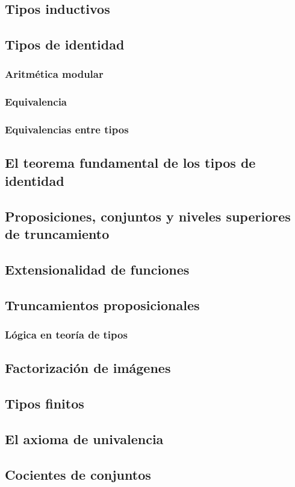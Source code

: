 \documentclass{article}
\begin{document}
\subsection{Tipos inductivos}

\subsection{Tipos de identidad}

\subsubsection{Aritmética modular}

\subsubsection{Equivalencia}
    \subsubsection{Equivalencias entre tipos}
\subsection{El teorema fundamental de los tipos de identidad}
\subsection{Proposiciones, conjuntos y niveles superiores de truncamiento}
\subsection{Extensionalidad de funciones}
\subsection{Truncamientos proposicionales}
\subsubsection{Lógica en teoría de tipos}
\subsection{Factorización de imágenes}
\subsection{Tipos finitos}
\subsection{El axioma de univalencia}
\subsection{Cocientes de conjuntos}



\end{document}
